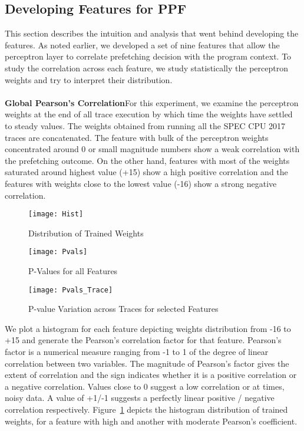 \subsection{Developing Features for PPF}
\label{Method-Features}
This section describes the intuition and analysis that went behind developing
the features.  As noted earlier, we developed a set of nine features that allow
the perceptron layer to correlate prefetching decision with the program
context.  To study the correlation across each feature, we study statistically
the perceptron weights and try to interpret their distribution. \\ \\
%
\textbf{Global Pearson's Correlation}\newline For this experiment, we examine
the perceptron weights at the end of all trace execution by which time the
weights have settled to steady values.  The weights obtained from running all
the SPEC CPU 2017 traces are concatenated.  The feature with bulk of the
perceptron weights concentrated around 0 or small magnitude numbers show a
weak correlation with the prefetching outcome.  On the other hand, features
with most of the weights saturated around highest value (+15) show a high
positive correlation and the features with weights close to the lowest value
(-16) show a strong negative correlation.

\begin{figure}[h]
  \begin{center}
    \texttt{[image: Hist]}
    \caption{Distribution of Trained Weights}
    \label{Fig:Hist}
  \end{center}
\end{figure}

\begin{figure}[h]
  \begin{center}
    \texttt{[image: Pvals]}
    \caption{P-Values for all Features}
    \label{Fig:Pvals}
  \end{center}
\end{figure}


\begin{figure}[h]
  \begin{center}
    \texttt{[image: Pvals\_Trace]}
    \caption{P-value Variation across Traces for selected Features}
    \label{Fig:Pvals_Trace}
  \end{center}
\end{figure}

We plot a histogram for each feature depicting weights distribution from -16
to +15 and generate the Pearson's correlation factor for that feature.
Pearson's factor is a numerical measure ranging from -1 to 1 of the degree of
linear correlation between two variables.  The magnitude of Pearson's factor
gives the extent of correlation and the sign indicates whether it is a
positive correlation or a negative correlation.  Values close to 0 suggest a
low correlation or at times, noisy data.  A value of +1/-1 suggests a
perfectly linear positive / negative correlation respectively.
Figure~\ref{Fig:Hist} depicts the histogram distribution of trained weights,
for a feature with high and another with moderate Pearson's coefficient.

